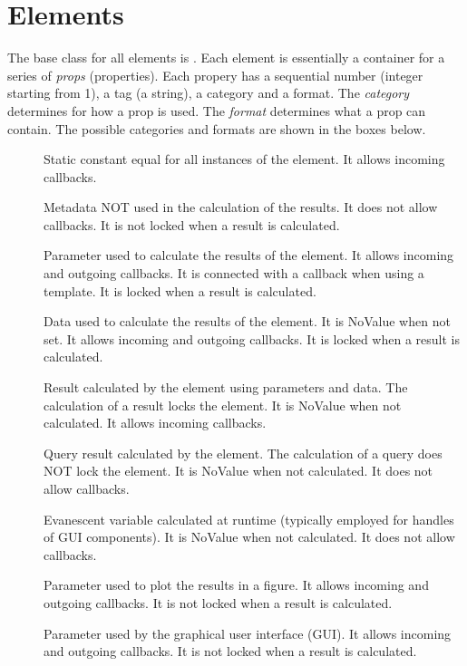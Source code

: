 \documentclass{tufte-handout}
\begin{document}
\section{Elements}

The base class for all elements is . 
Each element is essentially a container for a series of \emph{props} (properties). Each propery has a sequential number (integer starting from 1), a tag (a string), a category and a format.
The \emph{category} determines for how a prop is used.
The \emph{format} determines what a prop can contain.
The possible categories and formats are shown in the boxes below.

\begin{fullwidth}
\begin{tcolorbox}[
	title=Property Categories
]
\begin{description} 
 	\item[] Static constant equal for all instances of the element. It allows incoming callbacks.
 
 	\item[] Metadata NOT used in the calculation of the results. It does not allow callbacks. It is not locked when a result is calculated.
 
 	\item[] Parameter used to calculate the results of the element. It allows incoming and outgoing callbacks. It is connected with a callback when using a template. It is locked when a result is calculated.
 
 	\item[] Data used to calculate the results of the element. It is NoValue when not set. It allows incoming and outgoing callbacks. It is locked when a result is calculated.
 
 	\item[] Result calculated by the element using parameters and data. The calculation of a result locks the element. It is NoValue when not calculated. It allows incoming callbacks.
 
 	\item[] Query result calculated by the element. The calculation of a query does NOT lock the element. It is NoValue when not calculated. It does not allow callbacks.
 
 	\item[] Evanescent variable calculated at runtime (typically employed for handles of GUI components). It is NoValue when not calculated. It does not allow callbacks.
 
 	\item[] Parameter used to plot the results in a figure. It allows incoming and outgoing callbacks. It is not locked when a result is calculated.
                
 	\item[] Parameter used by the graphical user interface (GUI). It allows incoming and outgoing callbacks. It is not locked when a result is calculated.
\end{description}
\end{tcolorbox}
\end{fullwidth}
\end{document}
